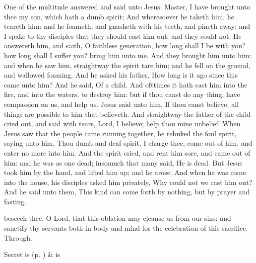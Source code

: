  One of the multitude answered and said unto Jesus: Master, I have brought unto thee my son, which hath a dumb spirit; And wheresoever he taketh him, he teareth him: and he foameth, and gnasheth with his teeth, and pineth away: and I spake to thy disciples that they should cast him out; and they could not. He answereth him, and saith, O faithless generation, how long shall I be with you? how long shall I suffer you? bring him unto me. And they brought him unto him: and when he saw him, straightway the spirit tare him; and he fell on the ground, and wallowed foaming. And he asked his father, How long is it ago since this came unto him? And he said, Of a child. And ofttimes it hath cast him into the fire, and into the waters, to destroy him: but if thou canst do any thing, have compassion on us, and help us. Jesus said unto him, If thou canst believe, all things are possible to him that believeth. And straightway the father of the child cried out, and said with tears, Lord, I believe; help thou mine unbelief. When Jesus saw that the people came running together, he rebuked the foul spirit, saying unto him, Thou dumb and deaf spirit, I charge thee, come out of him, and enter no more into him. And the spirit cried, and rent him sore, and came out of him: and he was as one dead; insomuch that many said, He is dead. But Jesus took him by the hand, and lifted him up; and he arose. And when he was come into the house, his disciples asked him privately, Why could not we cast him out? And he said unto them, This kind can come forth by nothing, but by prayer and fasting.

\clearpage
{}

\secret
{} beseech thee, O Lord, that this oblation may cleanse us from our sins: and sanctify thy servants both in body and mind for the celebration of this sacrifice. Through.
\begin{rubric}
     Secret is  (p. \pageref{SPSaints}) \&  is 
\end{rubric}



